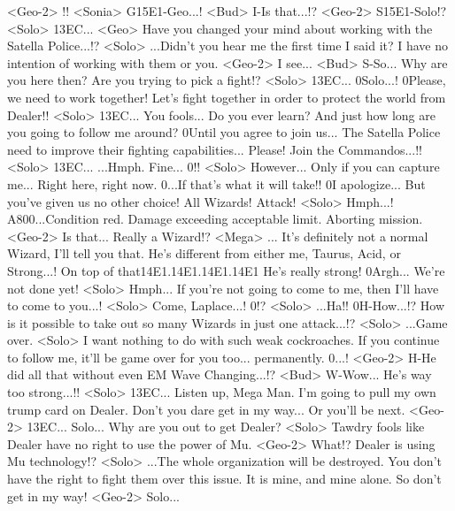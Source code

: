 <Geo-2> !! 
<Sonia> G{15}{E1}-Geo...! 
<Bud> I-Is that...!? 
<Geo-2> S{15}{E1}-Solo!? 
<Solo> {13}{EC}... 
<Geo> Have you changed your mind about working with the Satella Police...!? 
<Solo> ...Didn't you hear me the first time I said it? 
I have no intention of working with them or you. 
<Geo-2> I see... 
<Bud> S-So... Why are you here then? 
Are you trying to pick a fight!? 
<Solo> {13}{EC}... 
0Solo...! 
0Please, we need to work together! 
Let's fight together in order to protect the world from Dealer!! 
<Solo> {13}{EC}... 
You fools... Do you ever learn? 
And just how long are you going to follow me around? 
0Until you agree to join us... 
The Satella Police need to improve their fighting capabilities... 
Please! Join the Commandos...!! 
<Solo> {13}{EC}... 
...Hmph. Fine... 
0!! 
<Solo> However... 
Only if you can capture me... Right here, right now. 
0...If that's what it will take!! 
0I apologize... But you've given us no other choice! 
All Wizards! Attack! 
<Solo> Hmph...! 
{A8}{00}...Condition red. Damage exceeding acceptable limit. 
Aborting mission. 
<Geo-2> Is that... Really a Wizard!? 
<Mega> ... 
It's definitely not a normal Wizard, I'll tell you that. 
He's different from either me, Taurus, Acid, or Strong...! 
On top of that{14}{E1}.{14}{E1}.{14}{E1}.{14}{E1} He's really strong! 
0Argh... We're not done yet! 
<Solo> Hmph... 
If you're not going to come to me, then I'll have to come to you...! 
<Solo> Come, Laplace...! 
0!? 
<Solo> ...Ha!! 
0H-How...!? 
How is it possible to take out so many Wizards in just one attack...!? 
<Solo> ...Game over. 
<Solo> I want nothing to do with such weak cockroaches. 
If you continue to follow me, it'll be game over for you too... permanently. 
0...! 
<Geo-2> H-He did all that without even EM Wave Changing...!? 
<Bud> W-Wow... He's way too strong...!! 
<Solo> {13}{EC}... 
Listen up, Mega Man. 
I'm going to pull my own trump card on Dealer. 
Don't you dare get in my way... Or you'll be next. 
<Geo-2> {13}{EC}... 
Solo... 
Why are you out to get Dealer? 
<Solo> Tawdry fools like Dealer have no right to use the power of Mu. 
<Geo-2> What!? Dealer is using Mu technology!? 
<Solo> ...The whole organization will be destroyed. 
You don't have the right to fight them over this issue. 
It is mine, and mine alone. 
So don't get in my way! 
<Geo-2> Solo... 
